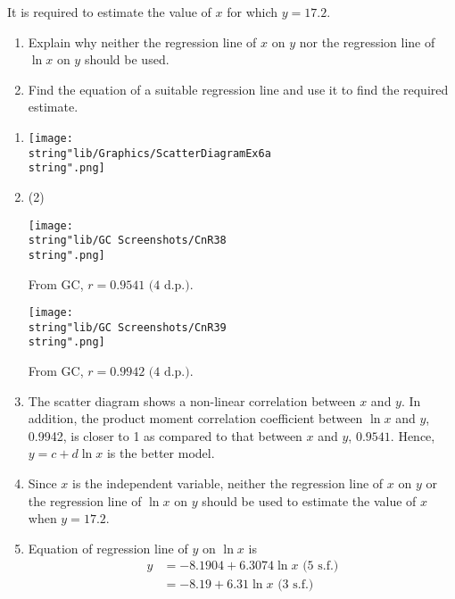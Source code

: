 \documentclass[11pt,a4paper]{book}
\begin{document}
\begin{example}
\begin{enumerate}[label=(\alph*),start=2]
\end{enumerate}

It is required to estimate the value of $x$ for which $y=17.2$. 

\begin{enumerate}[label=(\alph*),start=4] 

\item  Explain why neither the regression line of $x$ on $y$ nor
the regression line of $\ln x$ on $y$ should be used.

\item  Find the equation of a suitable regression line and use it
to find the required estimate.

\end{enumerate}

\newpage

\Solution

\begin{enumerate}[label=(\alph*)]

\item  \texttt{[image: \\string"lib/Graphics/ScatterDiagramEx6a\\string".png]}

\newpage

\item \begin{tasks}[label=(\roman*),label-width=3.5ex](2)

\task \texttt{[image: \\string"lib/GC Screenshots/CnR38\\string".png]}

From GC, $r=0.9541\text{ (4 d.p.)}$.

\task \texttt{[image: \\string"lib/GC Screenshots/CnR39\\string".png]}

From GC, $r=0.9942\text{ (4 d.p.)}$.

\end{tasks}

\item  The scatter diagram shows a non-linear correlation between
$x$ and $y$. In addition, the product moment correlation coefficient
between $\ln x$ and $y$, 0.9942, is closer to 1 as compared to that
between $x$ and $y$, $0.9541$. Hence, $y=c+d\ln x$ is the better
model.

\item  Since $x$ is the independent variable, neither the regression
line of $x$ on $y$ or the regression line of $\ln x$ on $y$ should
be used to estimate the value of $x$ when $y=17.2$. 

\item  Equation of regression line of $y$ on $\ln x$ is
\begin{align*}
y & =-8.1904+6.3074\ln x\text{ (5 s.f.)}\\
 & =-8.19+6.31\ln x\text{ (3 s.f.)}
\end{align*}


\end{enumerate}
\end{example}
\end{document}
